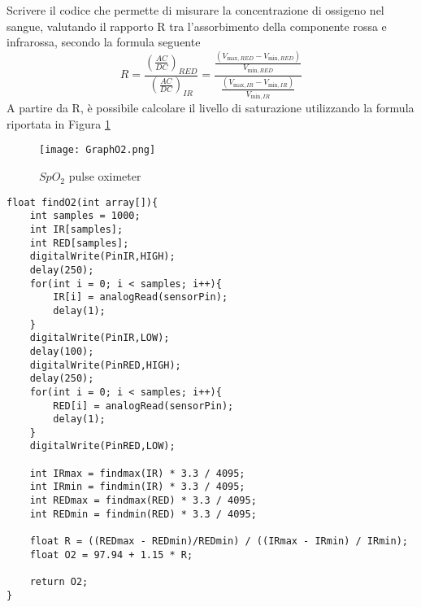 Scrivere il codice che permette di misurare la concentrazione di ossigeno nel sangue, valutando il rapporto R tra l’assorbimento della componente rossa e infrarossa, secondo la formula seguente
\begin{equation}
    R=\frac{\left(\frac{AC}{DC}\right)_{RED}}{\left(\frac{AC}{DC}\right)_{IR}}=\frac{\frac{\left(V_{\text{max},RED}-V_{\text{min},RED}\right)}{V_{\text{min},RED}}}{\frac{\left(V_{\text{max},IR}-V_{\text{min},IR}\right)}{V_{\text{min},IR}}}
\end{equation}
A partire da R, è possibile calcolare il livello di saturazione utilizzando la formula riportata in Figura \ref{fig:GraphO2}
\begin{figure}[H]
    \centering
    \texttt{[image: GraphO2.png]}
    \caption{$SpO_2$ pulse oximeter}
    \label{fig:GraphO2}
\end{figure}
\begin{lstlisting}[frame=single, language=Arduino]
float findO2(int array[]){
    int samples = 1000;
    int IR[samples];
    int RED[samples];
    digitalWrite(PinIR,HIGH);
    delay(250);
    for(int i = 0; i < samples; i++){
        IR[i] = analogRead(sensorPin);
        delay(1);
    }
    digitalWrite(PinIR,LOW);
    delay(100);
    digitalWrite(PinRED,HIGH);
    delay(250);
    for(int i = 0; i < samples; i++){
        RED[i] = analogRead(sensorPin);
        delay(1);
    }
    digitalWrite(PinRED,LOW);

    int IRmax = findmax(IR) * 3.3 / 4095;
    int IRmin = findmin(IR) * 3.3 / 4095;
    int REDmax = findmax(RED) * 3.3 / 4095;
    int REDmin = findmin(RED) * 3.3 / 4095; 

    float R = ((REDmax - REDmin)/REDmin) / ((IRmax - IRmin) / IRmin);
    float O2 = 97.94 + 1.15 * R;

    return O2;
}
\end{lstlisting}